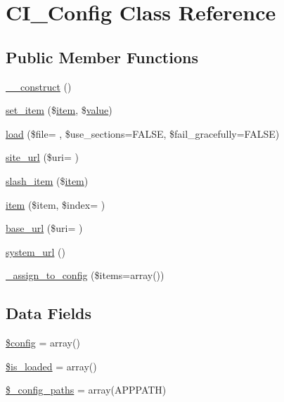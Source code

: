 \hypertarget{class_c_i___config}{}\section{C\+I\+\_\+\+Config Class Reference}
\label{class_c_i___config}
\subsection*{Public Member Functions}
\begin{DoxyCompactItemize}
\item 
\hyperlink{class_c_i___config_a095c5d389db211932136b53f25f39685}{\+\_\+\+\_\+construct} ()
\item 
\hyperlink{class_c_i___config_a3cbd3bcacb546d42f5dd12213df48627}{set\+\_\+item} (\$\hyperlink{class_c_i___config_accce7538d9763368e5955daf97d28f42}{item}, \$\hyperlink{fullpage_2plugin_8min_8js_ac56c57897e10f699d124e0103921aa20}{value})
\item 
\hyperlink{class_c_i___config_a0a60e9c6f42437ae6516365cde24f43d}{load} (\$file= \textquotesingle{}\textquotesingle{}, \$use\+\_\+sections=F\+A\+L\+SE, \$fail\+\_\+gracefully=F\+A\+L\+SE)
\item 
\hyperlink{class_c_i___config_a13bf10ba2927ce9b0bd17a1bd27c1f1a}{site\+\_\+url} (\$uri= \textquotesingle{}\textquotesingle{})
\item 
\hyperlink{class_c_i___config_abead21ebddc51d12402b5320d531eb1f}{slash\+\_\+item} (\$\hyperlink{class_c_i___config_accce7538d9763368e5955daf97d28f42}{item})
\item 
\hyperlink{class_c_i___config_accce7538d9763368e5955daf97d28f42}{item} (\$item, \$index= \textquotesingle{}\textquotesingle{})
\item 
\hyperlink{class_c_i___config_a1ece6d97b2f22c30cac390f926db1e43}{base\+\_\+url} (\$uri= \textquotesingle{}\textquotesingle{})
\item 
\hyperlink{class_c_i___config_a71e857f8dd38c230f1ce11bacf177ba8}{system\+\_\+url} ()
\item 
\hyperlink{class_c_i___config_a4eef305686918461a7ea846a8081be1e}{\+\_\+assign\+\_\+to\+\_\+config} (\$items=array())
\end{DoxyCompactItemize}
\subsection*{Data Fields}
\begin{DoxyCompactItemize}
\item 
\hyperlink{class_c_i___config_a49c7011be9c979d9174c52a8b83e5d8e}{\$config} = array()
\item 
\hyperlink{class_c_i___config_a908e9ad52a5d1956d360689452f6bdbe}{\$is\+\_\+loaded} = array()
\item 
\hyperlink{class_c_i___config_a5f47dbd2111b5bb6c91ece69fefebf26}{\$\+\_\+config\+\_\+paths} = array(A\+P\+P\+P\+A\+TH)
\end{DoxyCompactItemize}
